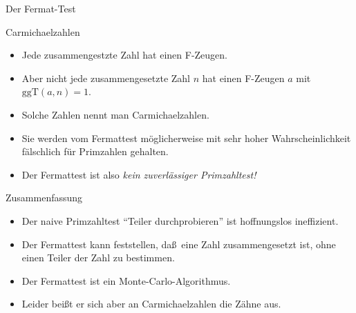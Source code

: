 \documentclass{beamer}
\renewcommand{\emph}[1]{{\textcolor{solarizedRed}{\itshape #1}}}
\newcommand{\ggt}{\mathrm{ggT}}
\renewcommand{\ae}{\"a}
\renewcommand{\oe}{\"o}
\newcommand{\ue}{\"u}
\begin{document}
\begin{frame}{Der Fermat-Test}
	\begin{block}{Carmichaelzahlen}
		\begin{itemize}
			\item Jede zusammengestzte Zahl hat einen F-Zeugen.
			\item Aber nicht jede zusammengesetzte Zahl $n$ hat einen F-Zeugen $a$ mit $\ggt(a,n)=1$.
			\item Solche Zahlen nennt man Carmichaelzahlen.
			\item Sie werden vom Fermattest m\oe glicherweise mit sehr hoher Wahrscheinlichkeit f\ae lschlich f\ue r Primzahlen gehalten.
			\item Der Fermattest ist also \emph{kein zuverl\ae ssiger Primzahltest!}
		\end{itemize}
	\end{block}
\end{frame}

\begin{frame}{Zusammenfassung}
		\begin{itemize}
			\item Der naive Primzahltest ``Teiler durchprobieren'' ist hoffnungslos ineffizient.
			\item Der Fermattest kann feststellen, da\ss\ eine Zahl zusammengesetzt ist, ohne einen Teiler der Zahl zu bestimmen.
			\item Der Fermattest ist ein Monte-Carlo-Algorithmus.
			\item Leider bei\ss t er sich aber an Carmichaelzahlen die Z\ae hne aus.
		\end{itemize}
\end{frame}
\end{document}
